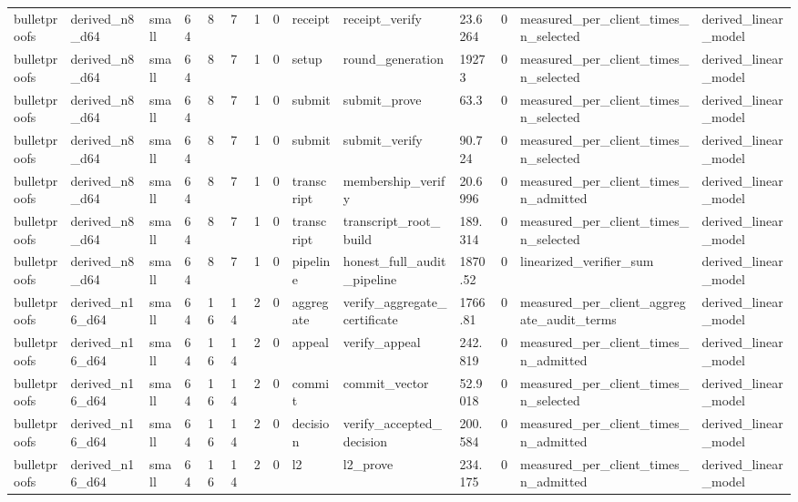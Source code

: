 \begin{table}[t]
\begin{tabular}{llllllllllllll}
bulletproofs & derived\_n8\_d64 & small & 64 & 8 & 7 & 1 & 0 & receipt & receipt\_verify & 23.6264 & 0 & measured\_per\_client\_times\_n\_selected & derived\_linear\_model \\
bulletproofs & derived\_n8\_d64 & small & 64 & 8 & 7 & 1 & 0 & setup & round\_generation & 19273 & 0 & measured\_per\_client\_times\_n\_selected & derived\_linear\_model \\
bulletproofs & derived\_n8\_d64 & small & 64 & 8 & 7 & 1 & 0 & submit & submit\_prove & 63.3 & 0 & measured\_per\_client\_times\_n\_selected & derived\_linear\_model \\
bulletproofs & derived\_n8\_d64 & small & 64 & 8 & 7 & 1 & 0 & submit & submit\_verify & 90.724 & 0 & measured\_per\_client\_times\_n\_selected & derived\_linear\_model \\
bulletproofs & derived\_n8\_d64 & small & 64 & 8 & 7 & 1 & 0 & transcript & membership\_verify & 20.6996 & 0 & measured\_per\_client\_times\_n\_admitted & derived\_linear\_model \\
bulletproofs & derived\_n8\_d64 & small & 64 & 8 & 7 & 1 & 0 & transcript & transcript\_root\_build & 189.314 & 0 & measured\_per\_client\_times\_n\_selected & derived\_linear\_model \\
bulletproofs & derived\_n8\_d64 & small & 64 & 8 & 7 & 1 & 0 & pipeline & honest\_full\_audit\_pipeline & 1870.52 & 0 & linearized\_verifier\_sum & derived\_linear\_model \\
bulletproofs & derived\_n16\_d64 & small & 64 & 16 & 14 & 2 & 0 & aggregate & verify\_aggregate\_certificate & 1766.81 & 0 & measured\_per\_client\_aggregate\_audit\_terms & derived\_linear\_model \\
bulletproofs & derived\_n16\_d64 & small & 64 & 16 & 14 & 2 & 0 & appeal & verify\_appeal & 242.819 & 0 & measured\_per\_client\_times\_n\_admitted & derived\_linear\_model \\
bulletproofs & derived\_n16\_d64 & small & 64 & 16 & 14 & 2 & 0 & commit & commit\_vector & 52.9018 & 0 & measured\_per\_client\_times\_n\_selected & derived\_linear\_model \\
bulletproofs & derived\_n16\_d64 & small & 64 & 16 & 14 & 2 & 0 & decision & verify\_accepted\_decision & 200.584 & 0 & measured\_per\_client\_times\_n\_admitted & derived\_linear\_model \\
bulletproofs & derived\_n16\_d64 & small & 64 & 16 & 14 & 2 & 0 & l2 & l2\_prove & 234.175 & 0 & measured\_per\_client\_times\_n\_admitted & derived\_linear\_model \\

\end{tabular}
\end{table}
